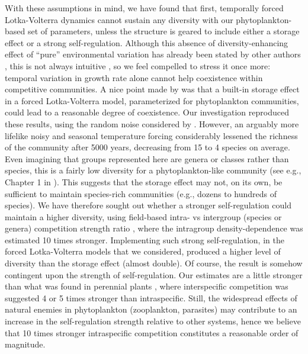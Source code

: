 \documentclass[a4paper,12pt]{article}
\begin{document}
With these assumptions in mind, we have found that first, temporally
forced Lotka-Volterra dynamics cannot sustain any diversity with our
phytoplankton-based set of parameters, unless the structure is geared
to include either a storage effect or a strong self-regulation. Although
this absence of diversity-enhancing effect of ``pure'' environmental
variation has already been stated by other authors \citep{chesson_roles_1997,barabas_community_2012,fox_intermediate_2013,scranton_coexistence_2016},
this is not always intuitive \citep{fox_intermediate_2013}, so we
feel compelled to stress it once more: temporal variation in growth
rate alone cannot help coexistence within competitive communities.
A nice point made by \citet{scranton_coexistence_2016} was that a
built-in storage effect in a forced Lotka-Volterra model, parameterized
for phytoplankton communities, could lead to a reasonable degree of
coexistence. Our investigation reproduced these results, using the
random noise considered by \citet{scranton_coexistence_2016}. However,
an arguably more lifelike noisy and seasonal temperature forcing considerably
lessened the richness of the community after 5000 years, decreasing
from 15 to 4 species on average. Even imagining that groups represented
here are genera or classes rather than species, this is a fairly low
diversity for a phytoplankton-like community (see e.g., Chapter 1
in \citealp{reynolds2006ecology}). This suggests that the storage
effect may not, on its own, be sufficient to maintain species-rich
communities (e.g., dozens to hundreds of species). We have therefore
sought out whether a stronger self-regulation could maintain a higher
diversity, using field-based intra- vs intergroup (species or genera)
competition strength ratio \citep{barraquand2018coastal}, where the
intragroup density-dependence was estimated 10 times stronger. Implementing
such strong self-regulation, in the forced Lotka-Volterra models that
we considered, produced a higher level of diversity than the storage
effect (almost double). Of course, the result is somehow contingent
upon the strength of self-regulation. Our estimates are a little stronger
than what was found in perennial plants \citep{adler_coexistence_2010},
where interspecific competition was suggested 4 or 5 times stronger
than intraspecific. Still, the widespread effects of natural enemies
in phytoplankton (zooplankton, parasites) may contribute to an increase
in the self-regulation strength \citep{barraquand2018coastal,chesson_updates_2018}
relative to other systems, hence we believe that 10 times stronger
intraspecific competition constitutes a reasonable order of magnitude.
\end{document}
